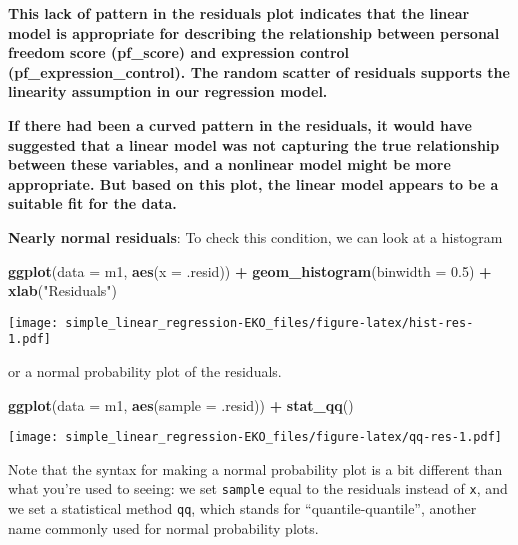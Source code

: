 \documentclass[
]{article}
\newenvironment{Shaded}{\begin{snugshade}}{\end{snugshade}}
\newcommand{\AttributeTok}[1]{\textcolor[rgb]{0.13,0.29,0.53}{#1}}
\newcommand{\FloatTok}[1]{\textcolor[rgb]{0.00,0.00,0.81}{#1}}
\newcommand{\FunctionTok}[1]{\textcolor[rgb]{0.13,0.29,0.53}{\textbf{#1}}}
\newcommand{\NormalTok}[1]{#1}
\newcommand{\SpecialCharTok}[1]{\textcolor[rgb]{0.81,0.36,0.00}{\textbf{#1}}}
\newcommand{\StringTok}[1]{\textcolor[rgb]{0.31,0.60,0.02}{#1}}
\begin{document}
\textbf{This lack of pattern in the residuals plot indicates that the
linear model is appropriate for describing the relationship between
personal freedom score (pf\_score) and expression control
(pf\_expression\_control). The random scatter of residuals supports the
linearity assumption in our regression model.}

\textbf{If there had been a curved pattern in the residuals, it would
have suggested that a linear model was not capturing the true
relationship between these variables, and a nonlinear model might be
more appropriate. But based on this plot, the linear model appears to be
a suitable fit for the data.}

\textbf{Nearly normal residuals}: To check this condition, we can look
at a histogram

\begin{Shaded}
\begin{Highlighting}[]
\FunctionTok{ggplot}\NormalTok{(}\AttributeTok{data =}\NormalTok{ m1, }\FunctionTok{aes}\NormalTok{(}\AttributeTok{x =}\NormalTok{ .resid)) }\SpecialCharTok{+}
  \FunctionTok{geom\_histogram}\NormalTok{(}\AttributeTok{binwidth =} \FloatTok{0.5}\NormalTok{) }\SpecialCharTok{+}
  \FunctionTok{xlab}\NormalTok{(}\StringTok{"Residuals"}\NormalTok{)}
\end{Highlighting}
\end{Shaded}

\texttt{[image: simple\_linear\_regression-EKO\_files/figure-latex/hist-res-1.pdf]}

or a normal probability plot of the residuals.

\begin{Shaded}
\begin{Highlighting}[]
\FunctionTok{ggplot}\NormalTok{(}\AttributeTok{data =}\NormalTok{ m1, }\FunctionTok{aes}\NormalTok{(}\AttributeTok{sample =}\NormalTok{ .resid)) }\SpecialCharTok{+}
  \FunctionTok{stat\_qq}\NormalTok{()}
\end{Highlighting}
\end{Shaded}

\texttt{[image: simple\_linear\_regression-EKO\_files/figure-latex/qq-res-1.pdf]}

Note that the syntax for making a normal probability plot is a bit
different than what you're used to seeing: we set \texttt{sample} equal
to the residuals instead of \texttt{x}, and we set a statistical method
\texttt{qq}, which stands for ``quantile-quantile'', another name
commonly used for normal probability plots.
\end{document}
